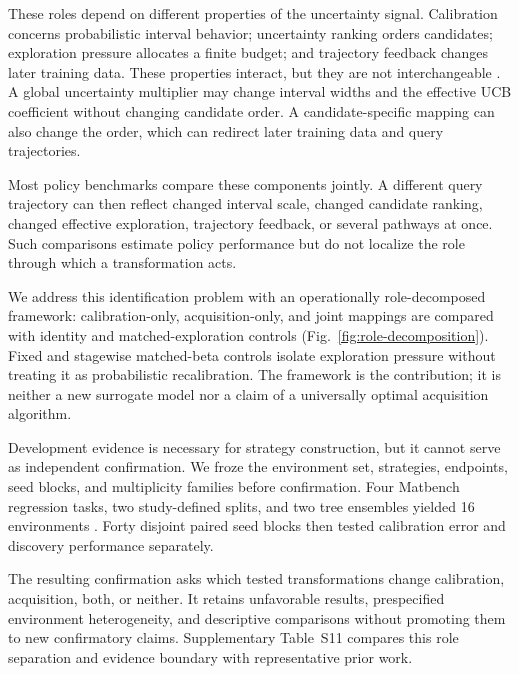 \documentclass[10pt]{article}
\begin{document}
These roles depend on different properties of the uncertainty signal.
Calibration concerns probabilistic interval behavior; uncertainty ranking
orders candidates; exploration pressure allocates a finite budget; and
trajectory feedback changes later training data. These properties interact,
but they are not interchangeable
\citep{gneiting2007proper,kuleshov2018calibrated,guo2017calibration,angelopoulos2023conformal,mandi2022decision,wilder2019decision,donti2017task}.
A global uncertainty multiplier may change interval widths and the effective
UCB coefficient without changing candidate order. A candidate-specific
mapping can also change the order, which can redirect later training data and
query trajectories.

Most policy benchmarks compare these components jointly. A different query
trajectory can then reflect changed interval scale, changed candidate ranking,
changed effective exploration, trajectory feedback, or several pathways at
once. Such comparisons estimate policy performance but do not localize the
role through which a transformation acts.

We address this identification problem with an operationally role-decomposed
framework: calibration-only, acquisition-only, and joint mappings are compared
with identity and matched-exploration controls
(Fig.~\ref{fig:role-decomposition}). Fixed and stagewise matched-beta controls
isolate exploration pressure without treating it as probabilistic
recalibration. The framework is the contribution; it is neither a new
surrogate model nor a claim of a universally optimal acquisition algorithm.

Development evidence is necessary for strategy construction, but it cannot
serve as independent confirmation. We froze the environment set, strategies,
endpoints, seed blocks, and multiplicity families before confirmation. Four
Matbench regression tasks, two study-defined splits, and two tree ensembles
yielded 16 environments
\citep{dunn2020matbench,ward2018matminer,butler2018mlmaterials}.
Forty disjoint paired seed blocks then tested calibration error and discovery
performance separately.

The resulting confirmation asks which tested transformations change
calibration, acquisition, both, or neither. It retains unfavorable results,
prespecified environment heterogeneity, and descriptive comparisons without
promoting them to new confirmatory claims. Supplementary Table~S11 compares
this role separation and evidence boundary with representative prior work.
\end{document}
